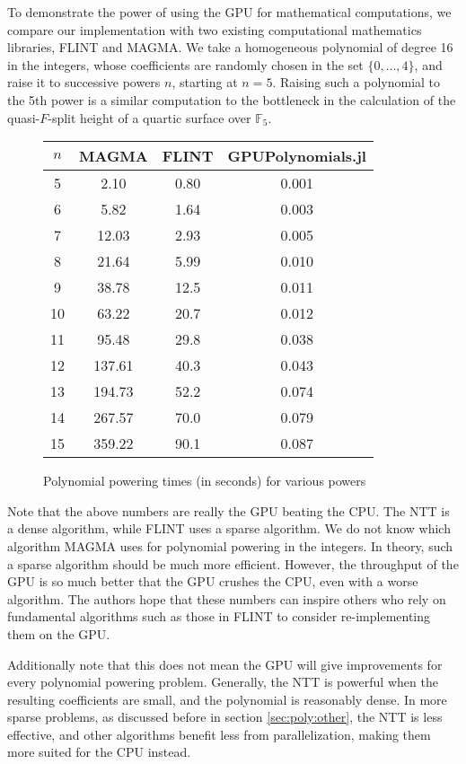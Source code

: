To demonstrate the power of using the GPU for mathematical computations, 
we compare our implementation
with two existing computational mathematics libraries, FLINT
and MAGMA.
We take a homogeneous polynomial of degree 16 in the integers,
whose coefficients are randomly chosen in the set 
\(\{0, \ldots, 4\}\), and raise it to successive powers \(n\),
starting at \(n=5\).
Raising such a polynomial to the 5th power is a similar 
computation to the bottleneck in the calculation of the
quasi-\(F\)-split height of a quartic surface over \(\mathbb{F}_{5}\).

\begin{figure}[h]
\begin{center}
\begin{tabular}{|c|c|c|c|}
    \hline
    \(n\) & MAGMA & FLINT & GPUPolynomials.jl \\
    \hline
    5 & 2.10 &    0.80 & 0.001 \\
    \hline                      
    6 & 5.82 &    1.64 & 0.003 \\
    \hline                      
    7 & 12.03 &   2.93 & 0.005 \\
    \hline                      
    8 & 21.64 &   5.99 & 0.010 \\
    \hline                      
    9 & 38.78 &   12.5 & 0.011 \\
    \hline                      
    10 & 63.22 &  20.7 & 0.012 \\
    \hline                      
    11 & 95.48 &  29.8 & 0.038 \\
    \hline                      
    12 & 137.61 & 40.3 & 0.043 \\
    \hline                      
    13 & 194.73 & 52.2 & 0.074 \\
    \hline                          
    14 & 267.57 & 70.0 & 0.079 \\
    \hline                          
    15 & 359.22 & 90.1 & 0.087 \\
    \hline
\end{tabular}
\caption{Polynomial powering times (in seconds) for various powers}
\end{center}
\end{figure}

Note that the above numbers are really the GPU beating the CPU.
The NTT is a dense algorithm, while FLINT uses a sparse algorithm.
We do not know which algorithm MAGMA uses for polynomial powering
in the integers.
In theory, such a sparse algorithm should
be much more efficient.
However, the throughput of the GPU is so much better that the
GPU crushes the CPU, even with a worse algorithm.
The authors hope that these numbers can inspire others who
rely on fundamental algorithms such as those in FLINT to 
consider re-implementing them on the GPU.

Additionally note that this does not mean the GPU will give 
improvements for every polynomial powering 
problem. Generally, the NTT is powerful when the resulting 
coefficients are small, and the polynomial is reasonably dense. 
In more sparse problems, as discussed before in section \ref{sec:poly:other}, 
the NTT is less effective, and other algorithms benefit less 
from parallelization, making them more 
suited for the CPU instead.
